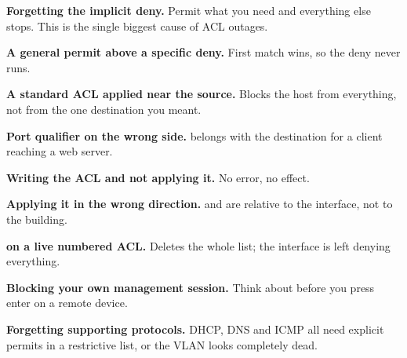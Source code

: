 \begin{pitfall}
\begin{tight}
  \item \textbf{Forgetting the implicit deny.} Permit what you need and everything
        else stops. This is the single biggest cause of ACL outages.
  \item \textbf{A general permit above a specific deny.} First match wins, so the
        deny never runs.
  \item \textbf{A standard ACL applied near the source.} Blocks the host from
        everything, not from the one destination you meant.
  \item \textbf{Port qualifier on the wrong side.}  belongs with the
        destination for a client reaching a web server.
  \item \textbf{Writing the ACL and not applying it.} No error, no effect.
  \item \textbf{Applying it in the wrong direction.}  and  are
        relative to the interface, not to the building.
  \item \textbf{ on a live numbered ACL.} Deletes the
        whole list; the interface is left denying everything.
  \item \textbf{Blocking your own management session.} Think about 
        before you press enter on a remote device.
  \item \textbf{Forgetting supporting protocols.} DHCP, DNS and ICMP all need
        explicit permits in a restrictive list, or the VLAN looks completely
        dead.
\end{tight}
\end{pitfall}

